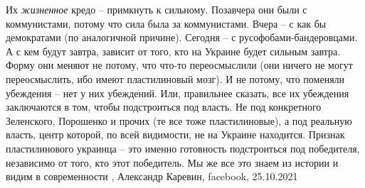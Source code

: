 Их \emph{жизненное} кредо – примкнуть к сильному. Позавчера они были с
коммунистами, потому что сила была  за коммунистами. Вчера –  с как бы
демократами (по аналогичной причине). Сегодня –  с русофобами-бандеровцами. А с
кем будут завтра, зависит от того, кто на Украине будет сильным завтра.  Форму
они меняют не потому, что что-то переосмыслили (они ничего не могут
переосмыслить, ибо имеют пластилиновый мозг). И не потому, что поменяли
убеждения – нет у них убеждений. Или, правильнее сказать, все их убеждения
заключаются в том, чтобы подстроиться под власть. Не под конкретного
Зеленского, Порошенко и прочих (те все тоже пластилиновые), а под реальную
власть, центр которой, по всей видимости, не на Украине находится.  Признак
пластилинового украинца – это именно готовность подстроиться под победителя,
независимо от того, кто этот победитель. Мы же все это знаем из истории и видим
в современности
, Александр Каревин, facebook, 25.10.2021%

